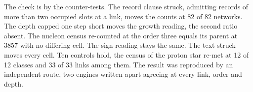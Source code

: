 \begin{chproof}[census]
The check is by the counter-tests. The record clause struck, admitting records of more than two occupied slots at a link, moves the counts at 82 of 82 networks. The depth capped one step short moves the growth reading, the second ratio absent. The nucleon census re-counted at the order three equals its parent at 3857 with no differing cell. The sign reading stays the same. The text struck moves every cell. Ten controls hold, the census of the proton star re-met at 12 of 12 classes and 33 of 33 links among them.
The result was reproduced by an independent route, two engines written apart agreeing at every link, order and depth.
\end{chproof}

\par\medskip{}\label{narr:close:13-5}\par
